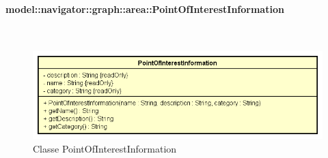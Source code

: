 \documentclass[../DefinizioneDiProdotto.tex]{subfiles}
\begin{document}
\paragraph{model::navigator::graph::area::PointOfInterestInformation}
\
\begin{figure}[H]
	\centering
	\includegraphics[width=\maxwidth]{img/PointOfInterestInformation.png}
	\caption{Classe PointOfInterestInformation}\label{fig:model::navigator::graph::area::PointOfInterestInformation} 
\end{figure}
\end{document}
